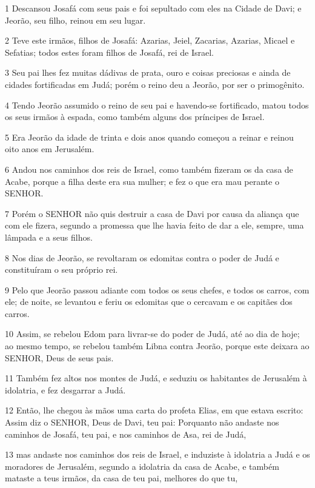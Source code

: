 \par 1 Descansou Josafá com seus pais e foi sepultado com eles na Cidade de Davi; e Jeorão, seu filho, reinou em seu lugar.
\par 2 Teve este irmãos, filhos de Josafá: Azarias, Jeiel, Zacarias, Azarias, Micael e Sefatias; todos estes foram filhos de Josafá, rei de Israel.
\par 3 Seu pai lhes fez muitas dádivas de prata, ouro e coisas preciosas e ainda de cidades fortificadas em Judá; porém o reino deu a Jeorão, por ser o primogênito.
\par 4 Tendo Jeorão assumido o reino de seu pai e havendo-se fortificado, matou todos os seus irmãos à espada, como também alguns dos príncipes de Israel.
\par 5 Era Jeorão da idade de trinta e dois anos quando começou a reinar e reinou oito anos em Jerusalém.
\par 6 Andou nos caminhos dos reis de Israel, como também fizeram os da casa de Acabe, porque a filha deste era sua mulher; e fez o que era mau perante o SENHOR.
\par 7 Porém o SENHOR não quis destruir a casa de Davi por causa da aliança que com ele fizera, segundo a promessa que lhe havia feito de dar a ele, sempre, uma lâmpada e a seus filhos.
\par 8 Nos dias de Jeorão, se revoltaram os edomitas contra o poder de Judá e constituíram o seu próprio rei.
\par 9 Pelo que Jeorão passou adiante com todos os seus chefes, e todos os carros, com ele; de noite, se levantou e feriu os edomitas que o cercavam e os capitães dos carros.
\par 10 Assim, se rebelou Edom para livrar-se do poder de Judá, até ao dia de hoje; ao mesmo tempo, se rebelou também Libna contra Jeorão, porque este deixara ao SENHOR, Deus de seus pais.
\par 11 Também fez altos nos montes de Judá, e seduziu os habitantes de Jerusalém à idolatria, e fez desgarrar a Judá.
\par 12 Então, lhe chegou às mãos uma carta do profeta Elias, em que estava escrito: Assim diz o SENHOR, Deus de Davi, teu pai: Porquanto não andaste nos caminhos de Josafá, teu pai, e nos caminhos de Asa, rei de Judá,
\par 13 mas andaste nos caminhos dos reis de Israel, e induziste à idolatria a Judá e os moradores de Jerusalém, segundo a idolatria da casa de Acabe, e também mataste a teus irmãos, da casa de teu pai, melhores do que tu,
